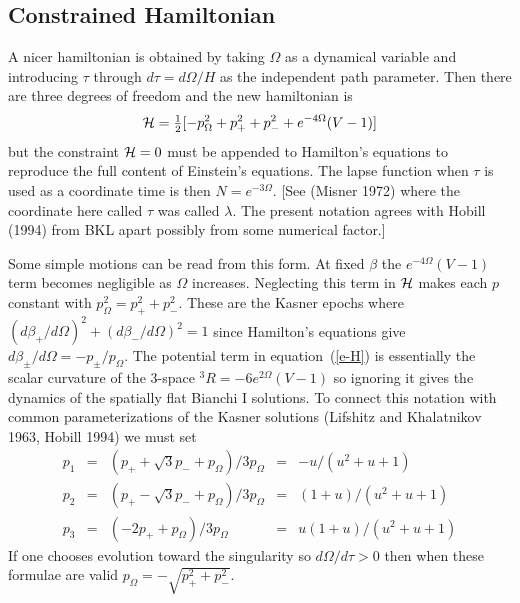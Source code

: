 \subsection{Constrained Hamiltonian}

\indent
A nicer hamiltonian is obtained by taking $\Omega$ as a dynamical
variable and introducing $\tau$ through $d\tau = d\Omega/H$
as the independent path parameter.  Then there are three degrees of
freedom and the new hamiltonian is
\begin{equation}\label{e-H}
 {\cal H} = \mbox{$\frac{1}{2}$}[-p_\Omega^2 + p_+^2 + p_-^2 + e^{-4\Omega}(V - 1)]
\end{equation}
but the constraint ${\cal H}=0$ must be appended to Hamilton's
equations to reproduce the full content of Einstein's equations.  The
lapse function when $\tau$ is used as a coordinate time is then $N =
e^{-3\Omega}$.  [See (Misner 1972) where the coordinate here called
$\tau$ was called $\lambda$. The present notation agrees with Hobill
(1994) from BKL apart possibly from some numerical factor.]

Some simple motions can be read from this form.
At fixed $\beta$ the $e^{-4\Omega}(V - 1)$ term becomes negligible as
$\Omega$ increases.  Neglecting this term in ${\cal H}$ makes each
$p$ constant with $p_\Omega^2 = p_+^2 + p_-^2$. These are the Kasner
epochs where $(d\beta_+/d\Omega)^2 + (d\beta_-/d\Omega)^2 = 1$ since
Hamilton's equations give $d\beta_\pm/d\Omega = - p_\pm/p_\Omega$.
The potential term in equation~(\ref{e-H}) is essentially the scalar
curvature of the 3-space ${}^3R = - 6 e^{2\Omega}(V - 1)$ so ignoring
it gives the dynamics of the spatially flat Bianchi I solutions.  To
connect this notation with common parameterizations of the Kasner
solutions (Lifshitz and Khalatnikov 1963, Hobill 1994) we must set
\begin{equation}\label{e-BKL}
\begin{array}{rcrcr}
  p_1  & = & (p_+ + \sqrt{3}p_- + p_\Omega)/3p_\Omega & = &
-u/(u^2+u+1) \\
  p_2  & = & (p_+ - \sqrt{3}p_- + p_\Omega)/3p_\Omega & = &
(1+u)/(u^2+u+1) \\
  p_3  & = & (-2p_+ + p_\Omega)/3p_\Omega & = &
u(1+u)/(u^2+u+1)
\end{array}
\end{equation}
If one chooses evolution toward the singularity so $d\Omega/d\tau >
0$ then when these formulae are valid $p_\Omega = -\sqrt{p_+^2 +
p_-^2}$.

